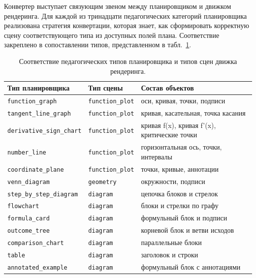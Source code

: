 Конвертер выступает связующим звеном между планировщиком и движком рендеринга. Для каждой из тринадцати педагогических категорий планировщика реализована стратегия конвертации, которая знает, как сформировать корректную сцену соответствующего типа из доступных полей плана. Соответствие закреплено в сопоставлении типов, представленном в табл.~\ref{tab:ch3:scene-mapping}.

\begin{table}[htbp]
\centering
\caption{Соответствие педагогических типов планировщика и типов сцен движка рендеринга.}
\label{tab:ch3:scene-mapping}
\small
\begin{tabular}{lll}
\toprule
\textbf{Тип планировщика} & \textbf{Тип сцены} & \textbf{Состав объектов} \\
\midrule
\texttt{function\_graph}        & \texttt{function\_plot} & оси, кривая, точки, подписи \\
\texttt{tangent\_line\_graph}   & \texttt{function\_plot} & кривая, касательная, точка касания \\
\texttt{derivative\_sign\_chart}& \texttt{function\_plot} & кривая f(x), кривая f'(x), критические точки \\
\texttt{number\_line}           & \texttt{function\_plot} & горизонтальная ось, точки, интервалы \\
\texttt{coordinate\_plane}      & \texttt{function\_plot} & точки, кривые, аннотации \\
\texttt{venn\_diagram}          & \texttt{geometry}        & окружности, подписи \\
\texttt{step\_by\_step\_diagram}& \texttt{diagram}         & цепочка блоков и стрелок \\
\texttt{flowchart}              & \texttt{diagram}         & блоки и стрелки по графу \\
\texttt{formula\_card}          & \texttt{diagram}         & формульный блок и подписи \\
\texttt{outcome\_tree}          & \texttt{diagram}         & корневой блок и ветви исходов \\
\texttt{comparison\_chart}      & \texttt{diagram}         & параллельные блоки \\
\texttt{table}                  & \texttt{diagram}         & заголовок и строки \\
\texttt{annotated\_example}     & \texttt{diagram}         & формульный блок с аннотациями \\
\bottomrule
\end{tabular}
\end{table}

